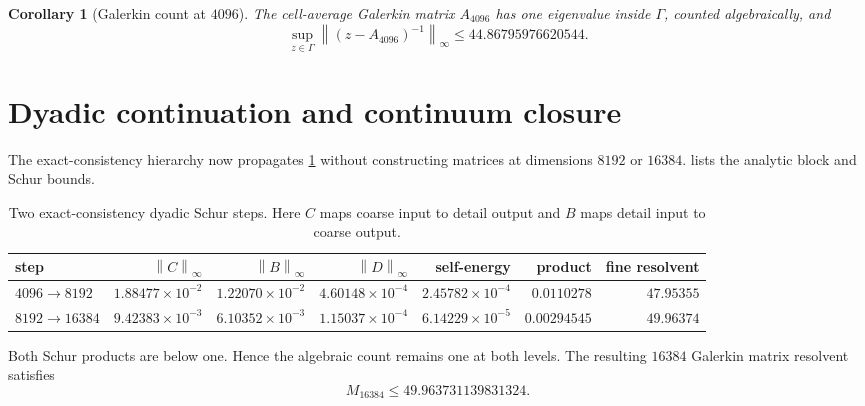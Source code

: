 \documentclass[11pt]{article}
\newtheorem{corollary}[theorem]{Corollary}
\theoremstyle{definition}
\theoremstyle{remark}
\newcommand{\norm}[1]{\left\lVert #1\right\rVert}
\begin{document}
\begin{corollary}[Galerkin count at $4096$]
\label{cor:galerkin4096}
The cell-average Galerkin matrix $A_{4096}$ has one eigenvalue inside
$\Gamma$, counted algebraically, and
\[
 \sup_{z\in\Gamma}\norm{(z-A_{4096})^{-1}}_\infty
 \le44.86795976620544.
\]
\end{corollary}

\section{Dyadic continuation and continuum closure}
\label{sec:continuum-closure}

The exact-consistency hierarchy now propagates
\cref{cor:galerkin4096} without constructing matrices at dimensions $8192$
or $16384$.   lists the analytic block and Schur bounds.

\begin{table}[H]
\centering
\caption{Two exact-consistency dyadic Schur steps.  Here $C$ maps coarse
input to detail output and $B$ maps detail input to coarse output.}
\label{tab:schur}
\scriptsize
\setlength{\tabcolsep}{3.5pt}
\begin{tabular}{@{}lrrrrrr@{}}
\toprule
step & $\norm C_\infty$ & $\norm B_\infty$ & $\norm D_\infty$
& self-energy & product & fine resolvent\\
\midrule
$4096\to8192$
& $1.88477{\times}10^{-2}$
& $1.22070{\times}10^{-2}$
& $4.60148{\times}10^{-4}$
& $2.45782{\times}10^{-4}$
& $0.0110278$
& $47.95355$\\
$8192\to16384$
& $9.42383{\times}10^{-3}$
& $6.10352{\times}10^{-3}$
& $1.15037{\times}10^{-4}$
& $6.14229{\times}10^{-5}$
& $0.00294545$
& $49.96374$\\
\bottomrule
\end{tabular}
\end{table}

Both Schur products are below one.  Hence the algebraic count remains one
at both levels.  The resulting $16384$ Galerkin matrix resolvent satisfies
\begin{equation}
 M_{16384}\le49.963731139831324.
 \label{eq:galerkin16384}
\end{equation}
\end{document}
